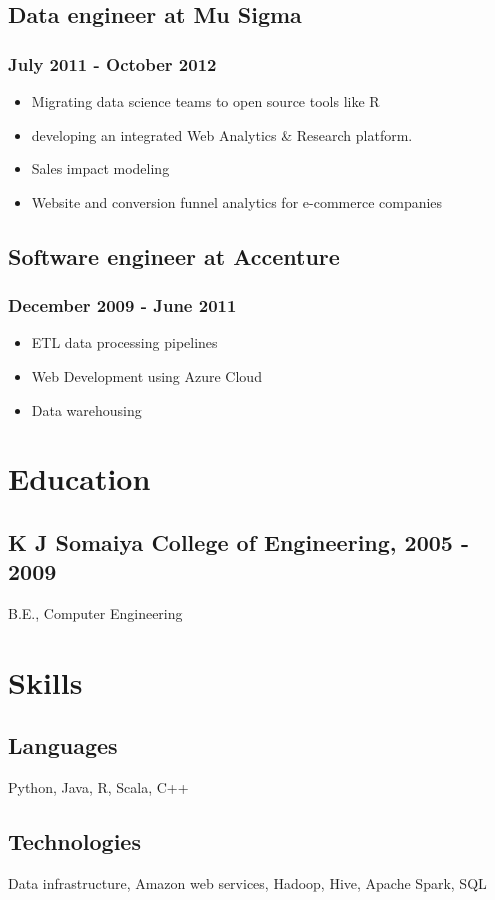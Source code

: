 \documentclass[letterpaper]{article}
\begin{document}
\subsection{Data engineer at Mu Sigma}
\label{sec:Data-engineer-at-Mu-Sigma}
\subsubsection{July 2011 - October 2012}
\label{sec:July-2011-October-2012}
\begin{itemize}
\item Migrating data science teams to open source tools like R
\item developing an integrated Web Analytics \& Research platform.
\item Sales impact modeling
\item Website and conversion funnel analytics for e-commerce companies
\end{itemize}
\subsection{Software engineer at Accenture}
\label{sec:Software-engineer-at-Accenture}
\subsubsection{December 2009 - June 2011}
\label{sec:December-2009-June-2011}
\begin{itemize}
\item ETL data processing pipelines
\item Web Development using Azure Cloud
\item Data warehousing
\end{itemize}
\section{Education}
\label{sec:Education}
\subsection{K J Somaiya College of Engineering, 2005 - 2009}
\label{sec:K-J-Somaiya-College-of-Engineering-2005-2009}
B.E., Computer Engineering
\section{Skills}
\label{sec:Skills}
\subsection{Languages}
\label{sec:Languages}
Python,
Java,
R,
Scala,
C++
\subsection{Technologies}
\label{sec:Technologies}
Data infrastructure,
Amazon web services,
Hadoop,
Hive,
Apache Spark,
SQL
\end{document}
